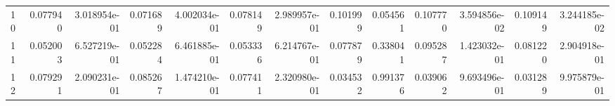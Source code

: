 \begin{tabular}{lrrrrrrrrrrrr}
10    &  0.077940 &  3.018954e-01 &  0.071689 &  4.002034e-01 &  0.078149 &  2.989957e-01 &  0.101999 &  0.054561 &  0.107770 &  3.594856e-02 &  0.109149 &  3.244185e-02 \\
11    &  0.052003 &  6.527219e-01 &  0.052284 &  6.461885e-01 &  0.053336 &  6.214767e-01 &  0.077879 &  0.338041 &  0.095287 &  1.423032e-01 &  0.081220 &  2.904918e-01 \\
12    &  0.079291 &  2.090231e-01 &  0.085267 &  1.474210e-01 &  0.077411 &  2.320980e-01 &  0.034532 &  0.991376 &  0.039062 &  9.693496e-01 &  0.031289 &  9.975879e-01 \\
\bottomrule
\end{tabular}
